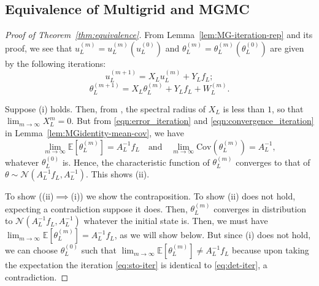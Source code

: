 \documentclass[11pt,english]{article}
\theoremstyle{plain}
\theoremstyle{plain}
\theoremstyle{plain}
\theoremstyle{plain}
\numberwithin{equation}{section}
\begin{document}
\subsection{Equivalence of Multigrid and MGMC}\label{sec:proof_equivalence}
\begin{proof}[Proof of Theorem~\ref{thm:equivalence}]
	From Lemma~\ref{lem:MG-iteration-rep} and its proof, we see that  $u_{L}^{(m)}=u_{L}^{(m)}(u_{L}^{(0)})$
	and $\theta_{L}^{(m)}=\theta_{L}^{(m)}(\theta_{L}^{(0)})$ are given
	by the following iterations:
	\begin{equation}
		u_{L}^{(m+1)}=X_{L}u_{L}^{(m)}+Y_{L}f_{L};\label{eq:det-iter}
	\end{equation}
	\begin{equation}
		\theta_{L}^{(m+1)}=X_{L}\theta_{L}^{(m)}+Y_{L}f_{L}+W_{L}^{(m)}.\label{eq:sto-iter}
	\end{equation}

	Suppose (i) holds. Then, from \cite[Theorem 3.5.1]{Young.D.M_book_1971},
	the spectral radius of $X_{L}$ is less than $1$, so that $\lim_{m\to\infty}X_{L}^{m}=0$.
	But from
	\eqref{eqn:error_iteration} and \eqref{eqn:convergence_iteration} in Lemma~\ref{lem:MGidentity-mean-cov}, we have
	\[
		\lim_{m\to\infty}\mathbb{E}[\theta_{L}^{(m)}]=A_{L}^{-1}f_{L}\quad\text{and}\quad\lim_{m\to\infty}\mathrm{Cov}(\theta_{L}^{(m)})=A_{L}^{-1},
	\]
	whatever $\theta_{L}^{(0)}$ is. Hence, the characteristic function
	of $\theta_{L}^{(m)}$ converges to that of $\theta\sim\mathcal{N}(A_{L}^{-1}f_{L},A_{L}^{-1})$.
	This shows (ii).

	To show ((ii)$\implies$(i)) we show the contraposition. 
	To show (ii) does not hold,
	expecting a contradiction suppose it does.
	Then, $\theta_{L}^{(m)}$
	converges in distribution to
	$\mathcal{N}(A_L^{-1}f_L,A_L^{-1})$
	whatever
	the initial state is.
	Then, we must have
	$\lim_{m\to\infty}\mathbb{E}[\theta_{L}^{(m)}]=A_L^{-1}f_L$,
	as we will show below. But since (i) does not hold, %
	we can choose $\theta_{L}^{(0)}$ such that
	$\lim_{m\to\infty}\mathbb{E}[\theta_{L}^{(m)}]\neq A_L^{-1}f_L$
	because upon taking the expectation the iteration \eqref{eq:sto-iter} is identical
	to \eqref{eq:det-iter}, a contradiction.


\end{proof}
\end{document}
